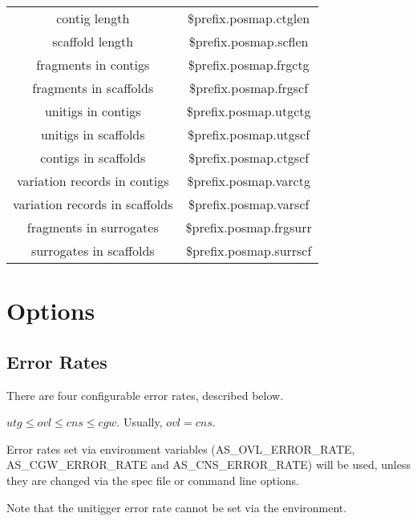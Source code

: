 \documentclass[twoside,11pt]{article}
\begin{document}
\begin{center}
\begin{tabular}{|c|c|}
\hline
\hline
contig length   & \$prefix.posmap.ctglen \\
scaffold length & \$prefix.posmap.scflen \\
\hline
fragments in contigs   & \$prefix.posmap.frgctg \\
fragments in scaffolds & \$prefix.posmap.frgscf \\
\hline
unitigs in contigs     & \$prefix.posmap.utgctg \\
unitigs in scaffolds   & \$prefix.posmap.utgscf \\
\hline
contigs in scaffolds   & \$prefix.posmap.ctgscf \\
\hline
variation records in contigs   & \$prefix.posmap.varctg \\
variation records in scaffolds & \$prefix.posmap.varscf \\
\hline
fragments in surrogates  & \$prefix.posmap.frgsurr \\
surrogates in scaffolds  & \$prefix.posmap.surrscf \\
\hline
\end{tabular}
\end{center}


\section{Options}

\subsection{Error Rates}
\label{sec:erates}

There are four configurable error rates, described below.

$utg \le ovl \le cns \le cgw$.  Usually, $ovl = cns$.

Error rates set via environment variables (AS\_OVL\_ERROR\_RATE,
AS\_CGW\_ERROR\_RATE and AS\_CNS\_ERROR\_RATE) will be used, unless they are
changed via the spec file or command line options.

Note that the unitigger error rate cannot be set via the environment.
\end{document}
